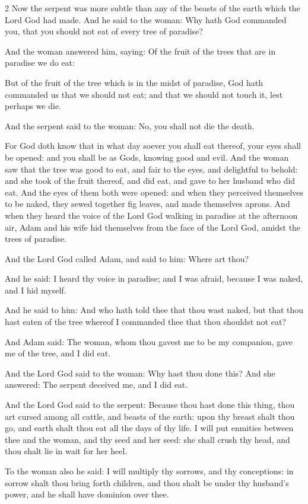 \begin{multicols}{2}\small
Now the serpent was more subtle than any of the beasts of the earth which the Lord God had made. And he said to the woman: Why hath God commanded you, that you should not eat of every tree of paradise?

And the woman answered him, saying: Of the fruit of the trees that are in paradise we do eat:

But of the fruit of the tree which is in the midst of paradise, God hath commanded us that we should not eat; and that we should not touch it, lest perhaps we die.

And the serpent said to the woman: No, you shall not die the death.

For God doth know that in what day soever you shall eat thereof, your eyes shall be opened: and you shall be as Gods, knowing good and evil. And the woman saw that the tree was good to eat, and fair to the eyes, and delightful to behold: and she took of the fruit thereof, and did eat, and gave to her husband who did eat. And the eyes of them both were opened: and when they perceived themselves to be naked, they sewed together fig leaves, and made themselves aprons. And when they heard the voice of the Lord God walking in paradise at the afternoon air, Adam and his wife hid themselves from the face of the Lord God, amidst the trees of paradise.

And the Lord God called Adam, and said to him: Where art thou?

And he said: I heard thy voice in paradise; and I was afraid, because I was naked, and I hid myself.

And he said to him: And who hath told thee that thou wast naked, but that thou hast eaten of the tree whereof I commanded thee that thou shouldst not eat?

And Adam said: The woman, whom thou gavest me to be my companion, gave me of the tree, and I did eat.

And the Lord God said to the woman: Why hast thou done this? And she answered: The serpent deceived me, and I did eat.

And the Lord God said to the serpent: Because thou hast done this thing, thou art cursed among all cattle, and beasts of the earth: upon thy breast shalt thou go, and earth shalt thou eat all the days of thy life. I will put enmities between thee and the woman, and thy seed and her seed: she shall crush thy head, and thou shalt lie in wait for her heel.

To the woman also he said: I will multiply thy sorrows, and thy conceptions: in sorrow shalt thou bring forth children, and thou shalt be under thy husband's power, and he shall have dominion over thee.


\end{multicols}
